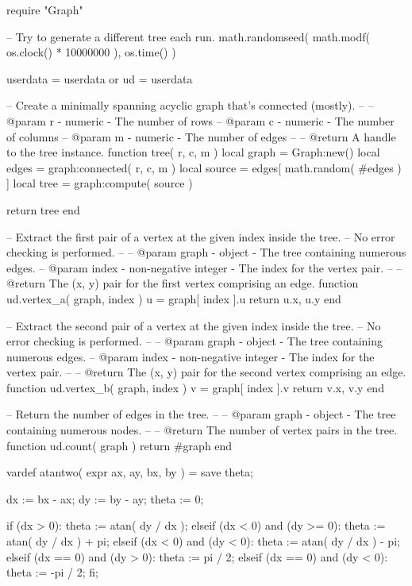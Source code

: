\definecolor[HexGridBase][h=EEEEEE]
\definecolor[HexGridNode][h=202020]
\definecolor[HexGridEdge][h=B0B0B0]

\startluacode
  require "Graph"

  -- Try to generate a different tree each run.
  math.randomseed( math.modf( os.clock() * 10000000 ), os.time() )

  userdata = userdata or {}
  ud = userdata

  -- Create a minimally spanning acyclic graph that's connected (mostly).
  --
  -- @param r - numeric - The number of rows
  -- @param c - numeric - The number of columns
  -- @param m - numeric - The number of edges
  --
  -- @return A handle to the tree instance.
  function tree( r, c, m )
    local graph = Graph:new()
    local edges = graph:connected( r, c, m )
    local source = edges[ math.random( #edges ) ]
    local tree = graph:compute( source )

    return tree
  end

  -- Extract the first pair of a vertex at the given index inside the tree.
  -- No error checking is performed.
  --
  -- @param graph - object - The tree containing numerous edges.
  -- @param index - non-negative integer - The index for the vertex pair.
  --
  -- @return The (x, y) pair for the first vertex comprising an edge.
  function ud.vertex_a( graph, index )
    u = graph[ index ].u
    return { u.x, u.y }
  end
  
  -- Extract the second pair of a vertex at the given index inside the tree.
  -- No error checking is performed.
  --
  -- @param graph - object - The tree containing numerous edges.
  -- @param index - non-negative integer - The index for the vertex pair.
  --
  -- @return The (x, y) pair for the second vertex comprising an edge.
  function ud.vertex_b( graph, index )
    v = graph[ index ].v
    return { v.x, v.y }
  end
  
  -- Return the number of edges in the tree.
  --
  -- @param graph - object - The tree containing numerous nodes.
  --
  -- @return The number of vertex pairs in the tree.
  function ud.count( graph )
    return #graph
  end
\stopluacode

\startMPinclusions
  vardef atantwo( expr ax, ay, bx, by ) =
    save theta;

    dx := bx - ax;
    dy := by - ay;
    theta := 0;

    if (dx > 0):
      theta := atan( dy / dx );
    elseif (dx < 0) and (dy >= 0):
      theta := atan( dy / dx ) + pi;
    elseif (dx < 0) and (dy < 0):
      theta := atan( dy / dx ) - pi;
    elseif (dx == 0) and (dy > 0):
      theta := pi / 2;
    elseif (dx == 0) and (dy < 0):
      theta := -pi / 2;
    fi;

